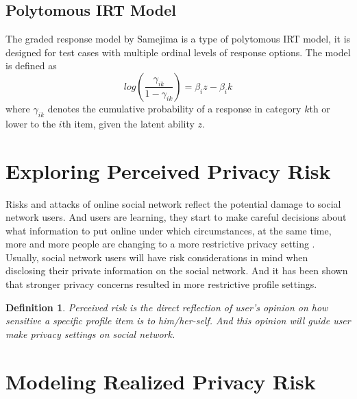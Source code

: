 \documentclass[a4paper]{article}
\newtheorem{simondef}{Definition}
\begin{document}
\subsection{Polytomous IRT Model}
The graded response model by Samejima is a type of polytomous IRT model, it is designed for test cases with multiple ordinal levels of response options. The model is defined as 
\[ log(\frac{\gamma_{ik}}{1-\gamma_{ik}}) = \beta_iz - \beta_ik \]
where $\gamma_{ik}$ denotes the cumulative probability of a response in category $k$th or lower to the $i$th item, given the latent ability $z$. 


\section{Exploring Perceived Privacy Risk}
Risks and attacks of online social network reflect the potential
damage to social network users. And users are learning, they start to
make careful decisions about what information to put online under
which circumstances, at the same time, more and more people are
changing to a more restrictive privacy setting \cite{socialnet:setting}.
Usually, social network users will have risk considerations in
mind when disclosing their private information
on the social network. And it has been shown
\cite{privacy:paradox:revisit} that stronger privacy
concerns resulted in more restrictive profile settings.

\begin{simondef}
Perceived risk is the direct reflection of
user's opinion on how sensitive a specific profile item is to
him/her-self. And this opinion will guide user make privacy settings
on social network.
\end{simondef}

\section{Modeling Realized Privacy Risk}
\end{document}
